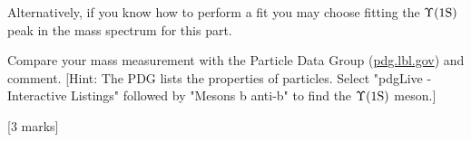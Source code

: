 \begin{enumerate}
Alternatively, if you know how to perform a fit you may choose fitting the $\Upsilon \rm (1S)$   peak in the mass spectrum for this part.

Compare your mass measurement with the Particle Data Group (\url{pdg.lbl.gov}) and comment.
[Hint: The PDG lists the properties of particles. Select "pdgLive - Interactive Listings" followed by "Mesons b anti-b" to find the $\Upsilon \rm (1S)$  meson.]

\hfill [3 marks]

\end{enumerate}
